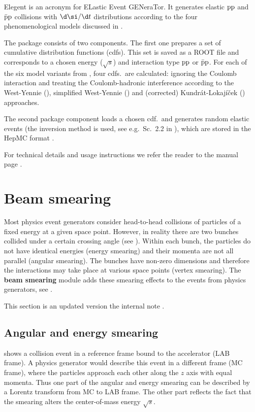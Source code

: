 Elegent is an acronym for ELastic Event GENeraTor. It generates elastic $\rm pp$ and $\rm\bar pp$ collisions with $\d\si/\d t$ distributions according to the four phenomenological models discussed in .

The package consists of two components. The first one prepares a set of cumulative distribution functions (cdfs). This set is saved as a ROOT file and corresponds to a chosen energy ($\sqrt s$) and interaction type $\rm pp$ or $\rm \bar pp$. For each of the six model variants from , four cdfs.~are calculated: ignoring the Coulomb interaction and treating the Coulomb-hadronic interference according to the West-Yennie (), simplified West-Yennie () and (corrected) Kundr\' at-Lokaj\' i\v cek () approaches.

The second package component loads a chosen cdf.~and generates random elastic events (the inversion method is used, see e.g.~Sc.~2.2 in ), which are stored in the HepMC format .

For technical details and usage instructions we refer the reader to the manual page .



\section[beam smearing]{Beam smearing}

Most physics event generators consider head-to-head collisions of particles of a fixed energy at a given space point. However, in reality there are two bunches collided under a certain crossing angle (see ). Within each bunch, the particles do not have identical energies (energy smearing) and their momenta are not all parallel (angular smearing). The bunches have non-zero dimensions and therefore the interactions may take place at various space points (vertex smearing). The {\bf beam smearing} module adds these smearing effects to the events from physics generators, see .

This section is an updated version the internal note .


\subsection{Angular and energy smearing}

 shows a collision event in a reference frame bound to the accelerator (LAB frame). A physics generator would describe this event in a different frame (MC frame), where the particles approach each other along the $z$ axis with equal momenta. Thus one part of the angular and energy smearing can be described by a Lorentz transform from MC to LAB frame. The other part reflects the fact that the smearing alters the center-of-mass energy $\sqrt s$.

